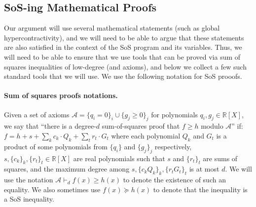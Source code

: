 \documentclass[11pt]{article}
\DeclareMathOperator*{\pE}{\widetilde{\mathbb{E}}}
\def \R {\mathbb{R}}
\def \cA {\mathcal{A}}
\def \sos {SoS\xspace}
\newcommand{\dor}[1]{}
\theoremstyle{definition}
\begin{document}


\subsection{SoS-ing Mathematical Proofs}
Our argument will use several mathematical statements (such 
as global hypercontractivity), and we will need to be 
able to argue that these statements are also satisfied 
in the context of the SoS program and its variables. Thus, 
we will need to be able to ensure that we use tools that can 
be proved via sum of squares inequalities of low-degree (and 
axioms), and below we collect a few such standard tools that we will use. We use the following notation for SoS prooofs.

\paragraph{Sum of squares proofs notations.}
Given a set of axioms $\cA = \{q_i = 0\}_i \cup \{g_j \ge 0\}_j$ for polynomials $q_i, g_j \in \R[X]$, we say that ``there is a degree-$d$ sum-of-squares proof that $f \ge h$ modulo $\cA$'' if: $f = h + s + \sum_k c_k\cdot Q_k + \sum_t r_t \cdot G_t$ where each polynomial $Q_k$ and $G_t$ is a product of some polynomials from $\{q_i\}$ and $\{g_j\}_j$ respectively, $s,\{c_k\}_k,\{r_t\}_t \in \R[X]$ are real polynomials such that $s$ and $\{r_t\}_t$ are sums of squares, and the maximum degree among $s,\{c_k Q_k\}_k, \{r_t G_t\}_t$ is at most $d$. We will use the notation $\cA \vdash_d f(x) \ge h(x)$ to denote the existence of such an equality.
We also sometimes use $f(x) \succeq h(x)$ to denote that the inequality is a \sos inequality.
\end{document}
